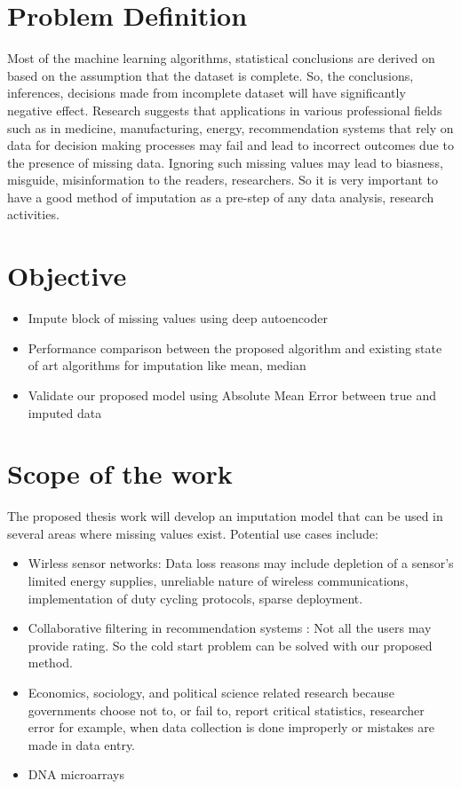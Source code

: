 \section{Problem Definition}

Most of the machine learning algorithms, statistical conclusions are derived on based on the assumption that the dataset is complete. So, the conclusions, inferences, decisions made from incomplete dataset will have significantly negative effect. Research suggests that applications in various professional fields such as in medicine, manufacturing, energy, recommendation systems that rely on data for decision making processes may fail and lead to incorrect outcomes due to the presence of missing data. Ignoring such missing values may lead to biasness, misguide, misinformation to the readers, researchers. So it is very important to have a good method of imputation as a pre-step of any data analysis, research activities. 
\section{Objective}
\begin{itemize}
\item Impute block of missing values using deep autoencoder
\item Performance comparison between the proposed algorithm and existing state of art algorithms for imputation like mean, median
\item Validate our proposed model using Absolute Mean Error between true and imputed data
\end{itemize}
\section{Scope of the work}
The proposed thesis work will develop an imputation model that can be used in several areas where missing values exist. 
Potential use cases include:
\begin{itemize}
\item Wirless sensor networks: Data loss reasons may include depletion of a sensor's limited energy supplies, unreliable nature of wireless communications, implementation of duty cycling protocols, sparse deployment.  
\item Collaborative filtering in recommendation systems : Not all the users may provide rating. So the cold start problem can be solved with our proposed method.
\item  Economics, sociology, and political science related research because governments choose not to, or fail to, report critical statistics, researcher error for example, when data collection is done improperly or mistakes are made in data entry.
\item DNA microarrays 
\end{itemize}


